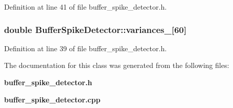 \-Definition at line 41 of file buffer\-\_\-spike\-\_\-detector.\-h.

\subsubsection[{variances\-\_\-}]{\setlength{\rightskip}{0pt plus 5cm}double {\bf \-Buffer\-Spike\-Detector\-::variances\-\_\-}[60]\hspace{0.3cm}{\ttfamily  [private]}}\label{classBufferSpikeDetector_a7244e1b359a691776cf33cd6da9f0b57}


\-Definition at line 39 of file buffer\-\_\-spike\-\_\-detector.\-h.



\-The documentation for this class was generated from the following files\-:\begin{DoxyCompactItemize}
\item 
{\bf buffer\-\_\-spike\-\_\-detector.\-h}\item 
{\bf buffer\-\_\-spike\-\_\-detector.\-cpp}\end{DoxyCompactItemize}
